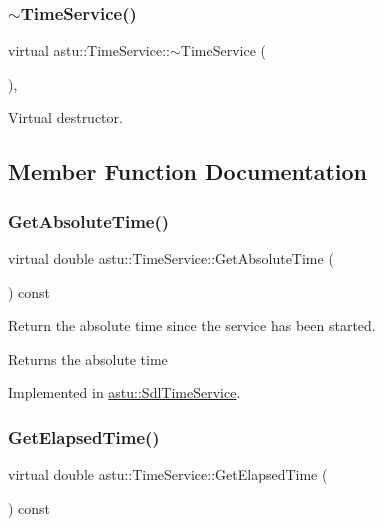 \subsubsection{\texorpdfstring{$\sim$\+Time\+Service()}{~TimeService()}}
{\footnotesize\ttfamily virtual astu\+::\+Time\+Service\+::$\sim$\+Time\+Service (\begin{DoxyParamCaption}{ }\end{DoxyParamCaption})\hspace{0.3cm}{\ttfamily [inline]}, {\ttfamily [virtual]}}

Virtual destructor. 

\subsection{Member Function Documentation}
\mbox{\label{classastu_1_1TimeService_a4c2eb07963ed65649f17e331ff20735a}} 
\subsubsection{\texorpdfstring{Get\+Absolute\+Time()}{GetAbsoluteTime()}}
{\footnotesize\ttfamily virtual double astu\+::\+Time\+Service\+::\+Get\+Absolute\+Time (\begin{DoxyParamCaption}{ }\end{DoxyParamCaption}) const\hspace{0.3cm}{\ttfamily [pure virtual]}}

Return the absolute time since the service has been started.

\begin{DoxyReturn}{Returns}
the absolute time 
\end{DoxyReturn}


Implemented in \hyperlink{classastu_1_1SdlTimeService_ab1cd9c0977c8b93cc4cdee22e0107bde}{astu\+::\+Sdl\+Time\+Service}.

\mbox{\label{classastu_1_1TimeService_af3b4f5f1b64d87e6fd8a2b81c48a2bf4}} 
\subsubsection{\texorpdfstring{Get\+Elapsed\+Time()}{GetElapsedTime()}}
{\footnotesize\ttfamily virtual double astu\+::\+Time\+Service\+::\+Get\+Elapsed\+Time (\begin{DoxyParamCaption}{ }\end{DoxyParamCaption}) const\hspace{0.3cm}{\ttfamily [pure virtual]}}

